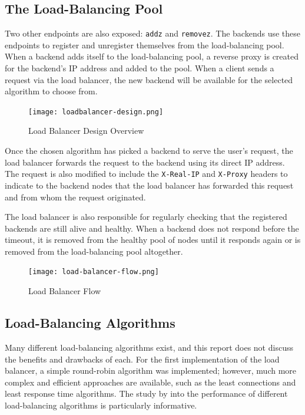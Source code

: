 \subsection{The Load-Balancing Pool}
Two other endpoints are also exposed: \verb|addz| and \verb|removez|. The backends use these endpoints to register and unregister themselves from the load-balancing pool. 
When a backend adds itself to the load-balancing pool, a reverse proxy is created for the backend's IP address and added to the pool.
When a client sends a request via the load balancer, the new backend will be available for the selected algorithm to choose from.

\begin{figure}[htbp]
\texttt{[image: loadbalancer-design.png]}
\centering
\caption{Load Balancer Design Overview}
\label{fig:loadbalancer-design}
\end{figure}

Once the chosen algorithm has picked a backend to serve the user's request, the load balancer forwards the request to the backend using its direct IP address.
The request is also modified to include the \verb|X-Real-IP| and \verb|X-Proxy| headers to indicate to the backend nodes that the load balancer has forwarded this request and from whom the request originated. 

The load balancer is also responsible for regularly checking that the registered backends are still alive and healthy. When a backend does not respond before the timeout, it is removed from the healthy pool of nodes until it responds again or is removed from the load-balancing pool altogether.

\begin{figure}[htbp]
\texttt{[image: load-balancer-flow.png]}
\centering
\caption{Load Balancer Flow}
\label{fig:loadbalancer-flow}
\end{figure}

\subsection{Load-Balancing Algorithms}
Many different load-balancing algorithms exist, and this report does not discuss the benefits and drawbacks of each.
For the first implementation of the load balancer, a simple round-robin algorithm was implemented; however, much more complex and efficient approaches are available, such as the least connections and least response time algorithms.
The study by \citeauthor{sharma2008performance} into the performance of different load-balancing algorithms is particularly informative.


